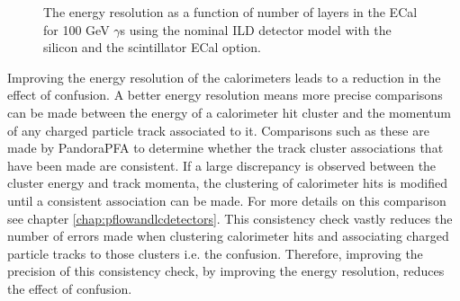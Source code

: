 \begin{figure}[h!]
\centering
{}
\caption[The energy resolution as a function of number of layers in the ECal for 100 GeV $\gamma$s using the nominal ILD detector model with \protect{} the silicon and \protect{} the scintillator ECal option.]{The energy resolution as a function of number of layers in the ECal for 100 GeV $\gamma$s using the nominal ILD detector model with \protect{} the silicon and \protect{} the scintillator ECal option.}
\label{fig:ecalnlayersgamma}
\end{figure}

Improving the energy resolution of the calorimeters leads to a reduction in the effect of confusion.  A better energy resolution means more precise comparisons can be made between the energy of a calorimeter hit cluster and the momentum of any charged particle track associated to it.  Comparisons such as these are made by PandoraPFA to determine whether the track cluster associations that have been made are consistent.  If a large discrepancy is observed between the cluster energy and track momenta, the clustering of calorimeter hits is modified until a consistent association can be made.  For more details on this comparison see chapter \ref{chap:pflowandlcdetectors}.  This consistency check vastly reduces the number of errors made when clustering calorimeter hits and associating charged particle tracks to those clusters i.e. the confusion.  Therefore, improving the precision of this consistency check, by improving the energy resolution, reduces the effect of confusion.  

